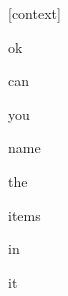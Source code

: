 \documentclass[varwidth]{standalone}
\begin{document}
\begin{CJK*}{UTF8}{gbsn}
{\setlength{\fboxsep}{0pt}\colorbox{white!0}{\parbox{0.9\textwidth}{
\colorbox{red!5.925291080542423e-15}{\strut [context]} \colorbox{red!6.551450496772304e-05}{\strut ok} \colorbox{red!4.995081326342188e-05}{\strut can} \colorbox{red!0.0005791167495772243}{\strut you} \colorbox{red!0.004556131549179554}{\strut name} \colorbox{red!0.08056781440973282}{\strut the} \colorbox{red!37.829193115234375}{\strut items} \colorbox{red!10.94239330291748}{\strut in} \colorbox{red!51.14259719848633}{\strut it} 
}}}
\end{CJK*}
\end{document}
